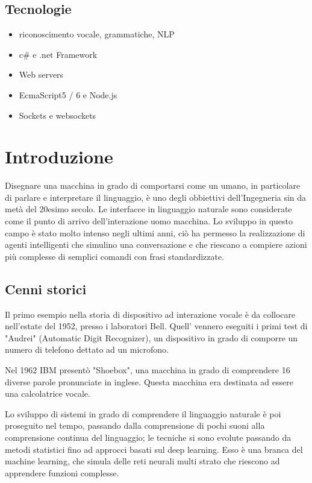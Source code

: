 \documentclass[twoside]{supsistudent}
\begin{document}
\section*{Tecnologie}
\begin{itemize}
\item riconoscimento vocale, grammatiche, NLP
\item c\# e .net Framework
\item Web servers
\item EcmaScript5 / 6 e Node.js
\item Sockets e websockets
\end{itemize}
\chapter{Introduzione}

Disegnare una macchina in grado di comportarsi come un umano, in particolare di parlare e interpretare il linguaggio, è uno degli obbiettivi dell'Ingegneria sin da metà del 20esimo secolo. Le interfacce in linguaggio naturale sono considerate come il punto di arrivo dell'interazione uomo macchina.
Lo sviluppo in questo campo è stato molto intenso negli ultimi anni, ciò ha permesso la realizzazione di agenti intelligenti che simulino una conversazione e che riescano a compiere azioni più complesse di semplici comandi con frasi standardizzate.

\section{Cenni storici}

Il primo esempio nella storia di dispositivo ad interazione vocale è da collocare nell'estate del 1952, presso i laboratori Bell.
Quell' vennero eseguiti i primi test di "Audrei" (Automatic Digit Recognizer), un dispositivo in grado di comporre un numero di telefono dettato ad un microfono.

Nel 1962 IBM presentò "Shoebox", una macchina in grado di comprendere 16 diverse parole pronunciate in inglese. Questa macchina era destinata ad essere una calcolatrice vocale.

Lo sviluppo di sistemi in grado di comprendere il linguaggio naturale è poi proseguito nel tempo, passando dalla comprensione di pochi suoni alla comprensione continua del linguaggio; le tecniche si sono evolute passando da metodi statistici fino ad approcci basati sul deep learning. Esso è una branca del machine learning, che simula delle reti neurali multi strato che riescono ad apprendere funzioni complesse. \cite{deeplearninggeneral}
\end{document}
